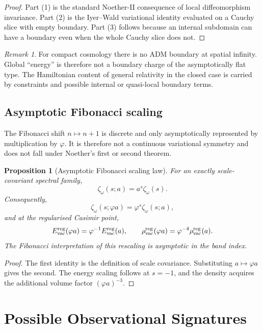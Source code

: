 \documentclass[reprint,aps,prd,letterpaper,superscriptaddress,nofootinbib,longbibliography,floatfix]{revtex4-2}
\newtheorem{proposition}[theorem]{Proposition}
\theoremstyle{remark}
\newtheorem{remark}[theorem]{Remark}
\begin{document}
\begin{proof}
Part (1) is the standard Noether-II consequence of local diffeomorphism
invariance.  Part (2) is the Iyer--Wald variational identity evaluated on a
Cauchy slice with empty boundary.  Part (3) follows because an internal subdomain
can have a boundary even when the whole Cauchy slice does not.
\end{proof}

\begin{remark}
For compact cosmology there is no ADM boundary at spatial infinity.  Global
``energy'' is therefore not a boundary charge of the asymptotically flat type.
The Hamiltonian content of general relativity in the closed case is carried by
constraints and possible internal or quasi-local boundary terms.
\end{remark}

\subsection{Asymptotic Fibonacci scaling}

The Fibonacci shift \(n\mapsto n+1\) is discrete and only asymptotically
represented by multiplication by \(\varphi\).  It is therefore not a continuous
variational symmetry and does not fall under Noether's first or second theorem.

\begin{proposition}[Asymptotic Fibonacci scaling law]
\label{prop:fib-scaling}
For an exactly scale-covariant spectral family,
\[
  \zeta_\omega(s;a)=a^s\zeta_\omega(s).
\]
Consequently,
\[
  \zeta_\omega(s;\varphi a)=\varphi^s\zeta_\omega(s;a),
\]
and at the regularised Casimir point,
\[
  E_{\rm vac}^{\rm reg}(\varphi a)
  =\varphi^{-1}E_{\rm vac}^{\rm reg}(a),
  \qquad
  \rho_{\rm vac}^{\rm reg}(\varphi a)
  =\varphi^{-4}\rho_{\rm vac}^{\rm reg}(a).
\]
The Fibonacci interpretation of this rescaling is asymptotic in the band index.
\end{proposition}

\begin{proof}
The first identity is the definition of scale covariance.  Substituting
\(a\mapsto\varphi a\) gives the second.  The energy scaling follows at
\(s=-1\), and the density acquires the additional volume factor
\((\varphi a)^{-3}\).
\end{proof}

\section{Possible Observational Signatures}
\end{document}
